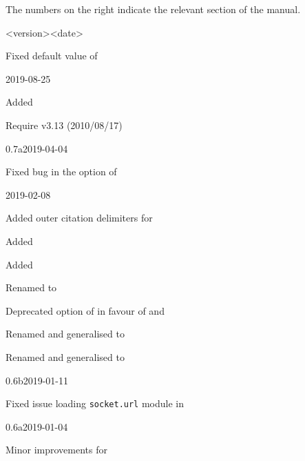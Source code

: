\documentclass[DIV=9]{scrartcl}
\begin{document}
The numbers on the right indicate the relevant section of the manual.
\begin{changelog}
\begin{release}{<version>}{<date>}
  \item Fixed default value of 
\end{release}
\begin{release}{0.8}{2019-08-25}
  \item Added  
  \item Require  v3.13 (2010/08/17)
\end{release}
\begin{release}{0.7a}{2019-04-04}
  \item Fixed bug in the  option of %
\end{release}
\begin{release}{0.7}{2019-02-08}
  \item Added outer citation delimiters for %
  \item Added 
  \item Added 
  \item Renamed   to
  \item Deprecated option  of  in
    favour of  and 
  \item Renamed and generalised  to
  \item Renamed and generalised  to
\end{release}
\begin{release}{0.6b}{2019-01-11}
  \item Fixed issue loading \texttt{socket.url} module in
\end{release}
\begin{release}{0.6a}{2019-01-04}
  \item Minor improvements for 
\end{release}

\end{changelog}
\end{document}
